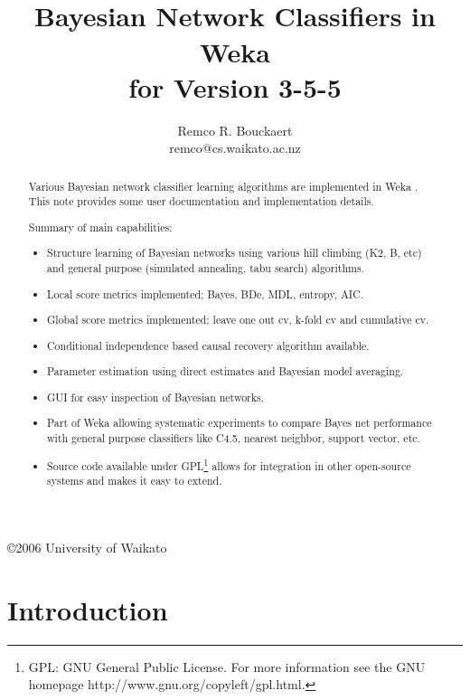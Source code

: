 \documentclass[a4paper]{article}
\title{\epsfig{file=images/coat_of_arms.eps,width=10cm}\vspace{3cm}\\Bayesian Network Classifiers in Weka\\for Version 3-5-5}
\author{Remco R. Bouckaert\\remco@cs.waikato.ac.nz}
\begin{document}
\begin{titlepage}

\maketitle
\thispagestyle{empty}

\center
\vspace{8cm}

\copyright 2006 University of Waikato

\end{titlepage}

\begin{abstract}
Various Bayesian network classifier learning algorithms are implemented in Weka \cite{weka}.
This note provides some user documentation and implementation details.

Summary of main capabilities:
\begin{itemize}
  \item Structure learning of Bayesian networks using various hill climbing (K2, B, etc) and
general purpose (simulated annealing, tabu search) algorithms.
  \item Local score metrics implemented; Bayes, BDe, MDL, entropy, AIC.
  \item Global score metrics implemented; leave one out cv, k-fold cv and cumulative cv.
  \item Conditional independence based causal recovery algorithm available.
  \item Parameter estimation using direct estimates and Bayesian model averaging.
  \item GUI for easy inspection of Bayesian networks.
  \item Part of Weka allowing systematic experiments to compare Bayes net performance with general 
purpose classifiers like C4.5, nearest neighbor, support vector, etc.
  \item Source code available under GPL\footnote{GPL: GNU General Public License. For more information see the GNU homepage http://www.gnu.org/copyleft/gpl.html.} allows for integration in other open-source systems and makes it easy to extend.
\end{itemize}
\end{abstract}
\newpage

\tableofcontents
\newpage

\section{Introduction}
\end{document}
